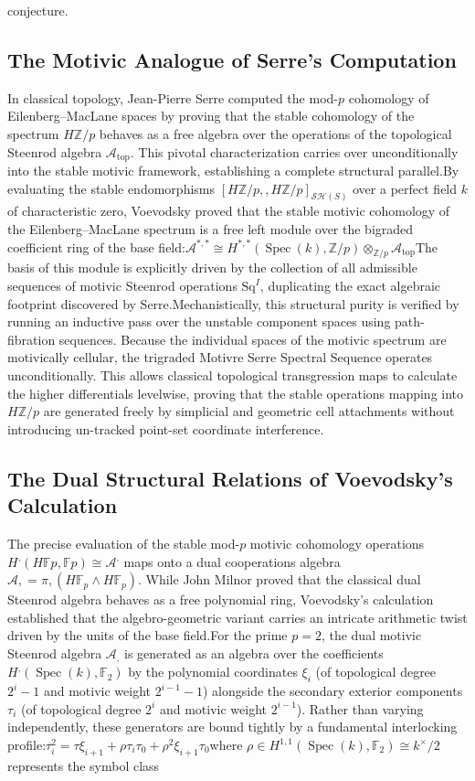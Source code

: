 \documentclass[11pt,oneside]{article}
\begin{document}
\begin{enumerate}
conjecture.\subsection{The Motivic Analogue of Serre's Computation}In classical topology, Jean-Pierre Serre computed the mod-$p$ cohomology of Eilenberg--MacLane spaces by proving that the stable cohomology of the spectrum $H\mathbb{Z}/p$ behaves as a free algebra over the operations of the topological Steenrod algebra $\mathcal{A}_{\text{top}}$. This pivotal characterization carries over unconditionally into the stable motivic framework, establishing a complete structural parallel.By evaluating the stable endomorphisms $[H\mathbb{Z}/p, , H\mathbb{Z}/p]_{\mathcal{S}\mathcal{H}(S)}$ over a perfect field $k$ of characteristic zero, Voevodsky proved that the stable motivic cohomology of the Eilenberg--MacLane spectrum is a free left module over the bigraded coefficient ring of the base field:\(\mathcal{A}^{*,*}\cong H^{*,*}(\>\mathrm{Spec}\>(k),\mathbb{Z}/p)\otimes _{\mathbb{Z}/p}\mathcal{A}_{\text{top}}\)The basis of this module is explicitly driven by the collection of all admissible sequences of motivic Steenrod operations ${\text{Sq}^I}$, duplicating the exact algebraic footprint discovered by Serre.Mechanistically, this structural purity is verified by running an inductive pass over the unstable component spaces using path-fibration sequences. Because the individual spaces of the motivic spectrum are motivically cellular, the trigraded Motivre Serre Spectral Sequence operates unconditionally. This allows classical topological transgression maps to calculate the higher differentials levelwise, proving that the stable operations mapping into $H\mathbb{Z}/p$ are generated freely by simplicial and geometric cell attachments without introducing un-tracked point-set coordinate interference.\subsection{The Dual Structural Relations of Voevodsky's Calculation}The precise evaluation of the stable mod-$p$ motivic cohomology operations $H^{,}(H\mathbb{F}p, \mathbb{F}p) \cong \mathcal{A}^{,}$ maps onto a dual cooperations algebra $\mathcal{A}{,} = \pi{,}(H\mathbb{F}_p \wedge H\mathbb{F}_p)$. While John Milnor proved that the classical dual Steenrod algebra behaves as a free polynomial ring, Voevodsky's calculation established that the algebro-geometric variant carries an intricate arithmetic twist driven by the units of the base field.For the prime $p=2$, the dual motivic Steenrod algebra $\mathcal{A}_{,}$ is generated as an algebra over the coefficients $H^{,}(\operatorname{Spec}(k), \mathbb{F}_2)$ by the polynomial coordinates $\xi_i$ (of topological degree $2^i-1$ and motivic weight $2^{i-1}-1$) alongside the secondary exterior components $\tau_i$ (of topological degree $2^i$ and motivic weight $2^{i-1}$). Rather than varying independently, these generators are bound tightly by a fundamental interlocking profile:\(\tau _{i}^{2}=\tau \xi _{i+1}+\rho \tau _{i}\tau _{0}+\rho ^{2}\xi _{i+1}\tau _{0}\)where $\rho \in H^{1,1}(\operatorname{Spec}(k), \mathbb{F}_2) \cong k^\times/2$ represents the symbol class 
\end{enumerate}
\end{document}

